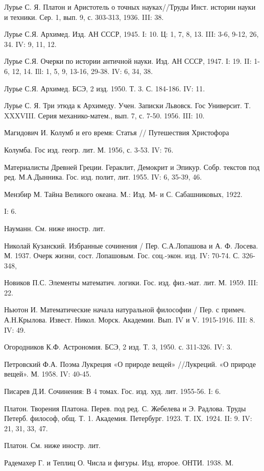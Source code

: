 Лурье С. Я. Платон и Аристотель о точных науках//Труды Инст. истории
науки и техники. Сер. 1, вып. 9, с. 303-313, 1936. III: 38.

Лурье С.Я. Архимед. Изд. АН СССР, 1945. I: 10. Ц: 1, 7, 8, 13. III:
3-6, 9-12, 26, 34. IV: 9, 11, 12.

Лурье С.Я. Очерки по истории античной науки. Изд. АН СССР, 1947. I:
19. II: 1-6, 12, 14. Ill: 1, 5, 9, 13-16, 29-38. IV: 6, 34, 38.

Лурье С.Я. Архимед. БСЭ, 2 изд. 1950. Т. 3. С. 184-186. IV: 11.

Лурье С. Я. Три этюда к Архимеду. Учен. Записки Львовск. Гос
Университ. Т. XXXVIII. Серия механико-матем., вып. 7, с. 7-50. 1956.
III: 10.

Магидович И. Колумб и его время: Статья // Путешествия Христофора

Колумба. Гос изд. геогр. лит. М. 1956, с. 3-53. IV: 76.

Материалисты Древней Греции. Гераклит, Демокрит и Эпикур. Собр.
текстов под ред. М.А.Дынника. Гос. изд. полит, лит. 1955. IV: 6,
35-39, 46.

Мензбир М. Тайна Великого океана. М.: Изд. М- и С. Сабашниковых, 1922.

I: 6.

Науманн. См. ниже иностр. лит.

Николай Кузанский. Избранные сочинения / Пер. С.А.Лопашова и А. Ф.
Лосева. М. 1937. Очерк жизни, сост. Лопашовым. Гос. соц.-экон. изд.
IV: 70-74. С. 326-348,

Новиков П.С. Элементы математич. логики. Гос. изд. физ.-мат. лит. М.
1959. III: 22.

Ньютон И. Математические начала натуральной философии / Пер. с примеч.
А.Н.Крылова. Извест. Никол. Морск. Академии. Вып. IV и V. 1915-1916.
III: 8. IV: 49.

Огородников К.Ф. Астрономия. БСЭ, 2 изд. Т. 3, 1950. с. 311-326. IV:
3.

Петровский Ф.А. Поэма Лукреция «О природе вещей» //Лукреций. «О
природе вещей». М. 1958. IV: 40-45.

Писарев Д.И. Сочинения: В 4 томах. Гос. изд. худ. лит. 1955-56. I: 6.

Платон. Творения Платона. Перев. под ред. С. Жебелева и Э. Радлова.
Труды Петерб. философ, общ. Т. 1. Академия. Петербург. 1923. Т. IX.
1924. II: 9. IV: 21, 31, 33, 47.

Платон. См. ниже иностр. лит.

Радемахер Г. и Теплиц О. Числа и фигуры. Изд. второе. ОНТИ. 1938. М.

